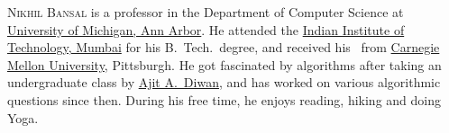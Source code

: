 \documentclass{toc}
\begin{document}
%
%
%
%
%
%
%
%
%
%
%
%
%
%
\begin{tocaboutauthors}
\begin{tocabout}[bansal]  %
  \textsc{Nikhil Bansal} is a professor in the %
Department  %
of Computer Science at \href{http://www.umich.edu}{University of Michigan, Ann Arbor}.
	He attended the \href{http://www.iitb.ac.in/}{Indian Institute of Technology, Mumbai} for his B.\ Tech.\  degree, and received his \phd\ from \href{http://www.cmu.edu/}{Carnegie Mellon University}, Pittsburgh.
He got fascinated by algorithms after taking an undergraduate class by 
\href{https://www.cse.iitb.ac.in/~aad/}{Ajit A.~Diwan},   %
and has worked on various algorithmic questions since then. During his free time, he enjoys reading, hiking and doing Yoga.
\end{tocabout}
\end{tocaboutauthors}
\end{document}
